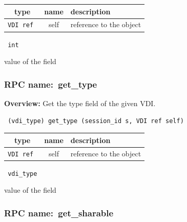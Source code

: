 
 
\vspace{0.3cm}
\begin{tabular}{|c|c|p{7cm}|}
 \hline
{\bf type} & {\bf name} & {\bf description} \\ \hline
{\tt VDI ref } & self & reference to the object \\ \hline 

\end{tabular}

\vspace{0.3cm}

{\tt 
int
}


value of the field
\vspace{0.3cm}
\vspace{0.3cm}
\vspace{0.3cm}
\subsubsection{RPC name:~get\_type}

{\bf Overview:} 
Get the type field of the given VDI.

\begin{verbatim} (vdi_type) get_type (session_id s, VDI ref self)\end{verbatim}



 
\vspace{0.3cm}
\begin{tabular}{|c|c|p{7cm}|}
 \hline
{\bf type} & {\bf name} & {\bf description} \\ \hline
{\tt VDI ref } & self & reference to the object \\ \hline 

\end{tabular}

\vspace{0.3cm}

{\tt 
vdi\_type
}


value of the field
\vspace{0.3cm}
\vspace{0.3cm}
\vspace{0.3cm}
\subsubsection{RPC name:~get\_sharable}

